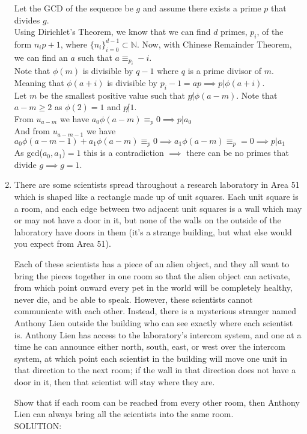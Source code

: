 \documentclass{article}
\begin{document}
\begin{enumerate}[1.]
Let the GCD of the sequence be $g$ and assume there exists a prime $p$ that divides $g$.\\
Using Dirichlet's Theorem, we know that we can find $d$ primes, $p_{i}$, of the form $n_{i}p + 1$, where $\{n_{i}\}_{i=0}^{d-1} \subset \mathbb{N}$.
Now, with Chinese Remainder Theorem, we can find an $a$ such that $a\equiv_{p_{i}} -i$.\\
Note that $\phi(m)$ is divisible by $q-1$ where $q$ is a prime divisor of $m$. Meaning that $\phi(a+i)$ is divisible by $p_{i}-1 = ap\implies p|\phi(a+i)$.\\
Let $m$ be the smallest positive value such that $p\not|\phi(a-m)$. Note that $a-m\geq2$ as $\phi(2) = 1$ and $p\not|1$.\\
From $u_{a-m}$ we have $a_{0}\phi(a-m) \equiv_{p} 0\implies p|a_{0}$\\
And from $u_{a-m-1}$ we have $a_{0}\phi(a-m-1) + a_{1}\phi(a-m) \equiv_{p}0\implies a_{1}\phi(a-m) \equiv_{p} = 0 \implies p|a_{1}$\\
As gcd($a_{0},a_{1}$)$=1$ this is a contradiction $\implies$ there can be no primes that divide $g\implies g=1$.

\vfill
\item %
There are some scientists spread throughout a research laboratory in Area 51 which is shaped like a rectangle made up of unit squares.
Each unit square is a room, and each edge between two adjacent unit squares is a wall which may or may not have a door in it, but none of the walls on the outside of the laboratory have doors in them (it's a strange building, but what else would you expect from Area 51).

Each of these scientists has a piece of an alien object, and they all want to bring the pieces together in one room so that the alien object can activate, from which point onward every pet in the world will be completely healthy, never die, and be able to speak.
However, these scientists cannot communicate with each other.
Instead, there is a mysterious stranger named Anthony Lien outside the building who can see exactly where each scientist is.
Anthony Lien has access to the laboratory's intercom system, and one at a time he can announce either north, south, east, or west over the intercom system, at which point each scientist in the building will move one unit in that direction to the next room; if the wall in that direction does not have a door in it, then that scientist will stay where they are.

Show that if each room can be reached from every other room, then Anthony Lien can always bring all the scientists into the same room.
\\SOLUTION:


\end{enumerate}
\end{document}
